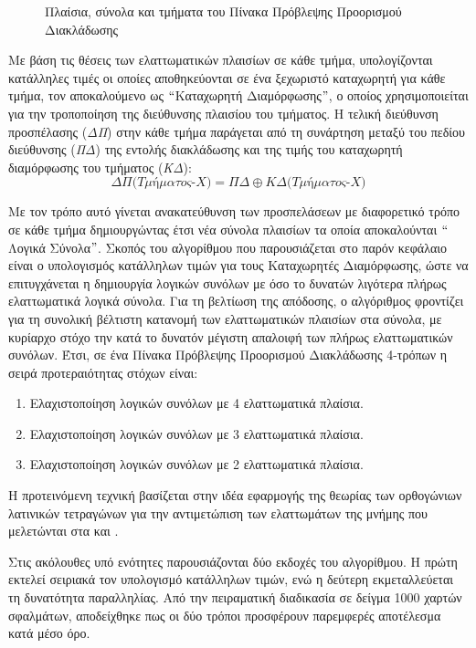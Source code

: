 \begin{figure}[t]
    \centering
    \caption{Πλαίσια, σύνολα και τμήματα του Πίνακα Πρόβλεψης Προορισμού Διακλάδωσης}
    \label{fig:chap5_btb_init}
\end{figure}

Με βάση τις θέσεις των ελαττωματικών πλαισίων σε κάθε τμήμα, υπολογίζονται κατάλληλες τιμές οι οποίες αποθηκεύονται σε ένα ξεχωριστό καταχωρητή για κάθε τμήμα, τον αποκαλούμενο ως $``$Καταχωρητή Διαμόρφωσης$"$, ο οποίος χρησιμοποιείται για την τροποποίηση της διεύθυνσης πλαισίου του τμήματος. Η τελική διεύθυνση προσπέλασης (\textit{ΔΠ}) στην κάθε τμήμα παράγεται από τη συνάρτηση \xor μεταξύ του πεδίου διεύθυνσης (\textit{ΠΔ}) της εντολής διακλάδωσης και της τιμής του καταχωρητή διαμόρφωσης του τμήματος (\textit{ΚΔ}):
\begin{equation}
    \textit{ΔΠ(Τμήματος-Χ)} = \textit{ΠΔ} \oplus \textit{ΚΔ(Τμήματος-Χ)}
\end{equation}
\par
Με τον τρόπο αυτό γίνεται ανακατεύθυνση των προσπελάσεων με διαφορετικό τρόπο σε κάθε τμήμα δημιουργώντας έτσι νέα σύνολα πλαισίων τα οποία αποκαλούνται $``$Λογικά Σύνολα$"$. Σκοπός του αλγορίθμου που παρουσιάζεται στο παρόν κεφάλαιο είναι ο υπολογισμός κατάλληλων τιμών για τους Καταχωρητές Διαμόρφωσης, ώστε να επιτυγχάνεται η δημιουργία λογικών συνόλων με όσο το δυνατών λιγότερα πλήρως ελαττωματικά λογικά σύνολα. Για τη βελτίωση της απόδοσης, ο αλγόριθμος φροντίζει για τη συνολική βέλτιστη κατανομή των ελαττωματικών πλαισίων στα σύνολα, με κυρίαρχο στόχο την κατά το δυνατόν μέγιστη απαλοιφή των πλήρως ελαττωματικών συνόλων. Έτσι, σε ένα Πίνακα Πρόβλεψης Προορισμού Διακλάδωσης 4-τρόπων η σειρά προτεραιότητας στόχων είναι:

\begin{enumerate}[before=\itshape,font=\normalfont]
    \item Ελαχιστοποίηση λογικών συνόλων με 4 ελαττωματικά πλαίσια.
    \item Ελαχιστοποίηση λογικών συνόλων με 3 ελαττωματικά πλαίσια.
    \item Ελαχιστοποίηση λογικών συνόλων με 2 ελαττωματικά πλαίσια.
\end{enumerate}

Η προτεινόμενη τεχνική βασίζεται στην ιδέα εφαρμογής της θεωρίας των ορθογώνιων λατινικών τετραγώνων για την αντιμετώπιση των ελαττωμάτων της μνήμης που μελετώνται στα \cite{hsiao1975orthogonal} και \cite{bossen1984fault}.
\par
Στις ακόλουθες υπό ενότητες παρουσιάζονται δύο εκδοχές του αλγορίθμου. Η πρώτη εκτελεί σειριακά τον υπολογισμό κατάλληλων τιμών, ενώ η δεύτερη εκμεταλλεύεται τη δυνατότητα παραλληλίας. Από την πειραματική διαδικασία σε δείγμα 1000 χαρτών σφαλμάτων, αποδείχθηκε πως οι δύο τρόποι προσφέρουν παρεμφερές αποτέλεσμα κατά μέσο όρο.

